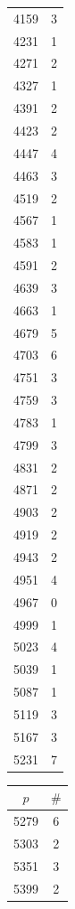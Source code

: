 \documentclass[10pt,a4paper]{amsart}
\begin{document}
\begin{table}[htbp]
\begin{minipage}{0.135\textwidth}
\begin{tabular}{c|c}
        4159 & 3 \\
        4231 & 1 \\
        4271 & 2 \\
        4327 & 1 \\
        4391 & 2 \\
        4423 & 2 \\
        4447 & 4 \\
        4463 & 3 \\
        4519 & 2 \\
        4567 & 1 \\
        4583 & 1 \\
        4591 & 2 \\
        4639 & 3 \\
        4663 & 1 \\
        4679 & 5 \\
        4703 & 6 \\
        4751 & 3 \\
        4759 & 3 \\
        4783 & 1 \\
        4799 & 3 \\
        4831 & 2 \\
        4871 & 2 \\
        4903 & 2 \\
        4919 & 2 \\
        4943 & 2 \\
        4951 & 4 \\
        4967 & 0 \\
        4999 & 1 \\
        5023 & 4 \\
        5039 & 1 \\
        5087 & 1 \\
        5119 & 3 \\
        5167 & 3 \\
        5231 & 7
    \end{tabular}
\end{minipage}\hspace{-2mm}
%
\begin{minipage}{0.135\textwidth}
    \centering
    \begin{tabular}{c|c}
        $p$ & $\#$ \\ \hline
        5279 & 6 \\
        5303 & 2 \\
        5351 & 3 \\
        5399 & 2 \\

\end{tabular}
\end{minipage}
\end{table}
\end{document}
